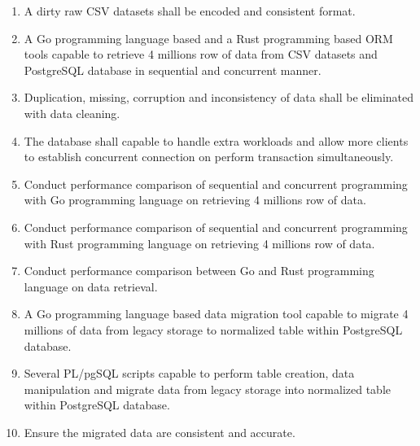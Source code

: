 \begin{enumerate}[topsep=0pt,itemsep=-1ex,partopsep=1ex,parsep=1.5ex]
	
\item A dirty raw CSV datasets shall be encoded and consistent format. 
\item A Go programming language based and a Rust programming based ORM tools capable to retrieve 4 millions row of data from CSV datasets and PostgreSQL database in sequential and concurrent manner. 
\item Duplication, missing, corruption and inconsistency of data shall be eliminated with data cleaning. 
\item The database shall capable to handle extra workloads and allow more clients to establish concurrent connection on perform transaction simultaneously. 
\item Conduct performance comparison of sequential and concurrent programming with Go programming language on retrieving 4 millions row of data. 
\item Conduct performance comparison of sequential and concurrent programming with Rust programming language on retrieving 4 millions row of data. 
\item Conduct performance comparison between Go and Rust programming language on data retrieval. 
\item A Go programming language based data migration tool capable to migrate 4 millions of data from legacy storage to normalized table within PostgreSQL database. 
\item Several PL/pgSQL scripts capable to perform table creation, data manipulation and migrate data from legacy storage into normalized table within PostgreSQL database. 
\item Ensure the migrated data are consistent and accurate. 

\end{enumerate}

